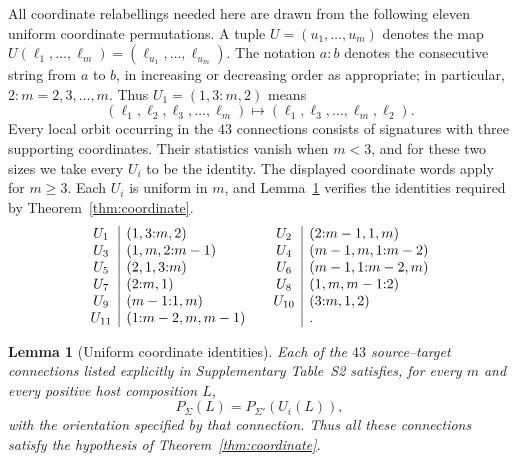 \documentclass[12pt]{article}
\newtheorem{lem}[thm]{Lemma}
\begin{document}
All coordinate relabellings needed here are drawn from the following eleven
uniform coordinate permutations.  A tuple
$U=(u_1,\ldots,u_m)$ denotes the map
$U(\ell_1,\ldots,\ell_m)=(\ell_{u_1},\ldots,\ell_{u_m})$.
The notation $a{:}b$ denotes the consecutive string from $a$ to $b$, in
increasing or decreasing order as appropriate; in particular,
$2{:}m=2,3,\ldots,m$.  Thus
$U_1=(1,3{:}m,2)$ means
\[
(\ell_1,\ell_2,\ell_3,\ldots,\ell_m)
\longmapsto
(\ell_1,\ell_3,\ldots,\ell_m,\ell_2).
\]
Every local orbit occurring in the $43$ connections consists of signatures
with three supporting coordinates.  Their statistics vanish
when $m<3$, and for these two sizes we take every $U_i$ to be the identity.
The displayed coordinate words apply for $m\ge3$.  Each $U_i$ is uniform in
$m$, and Lemma~\ref{lem:coordinate-identities} verifies the identities required by
Theorem~\ref{thm:coordinate}.
\[
\begin{array}{c|l@{\qquad}c|l}
U_1&(1,3{:}m,2)&U_2&(2{:}m-1,1,m)\\
U_3&(1,m,2{:}m-1)&U_4&(m-1,m,1{:}m-2)\\
U_5&(2,1,3{:}m)&U_6&(m-1,1{:}m-2,m)\\
U_7&(2{:}m,1)&U_8&(1,m,m-1{:}2)\\
U_9&(m-1{:}1,m)&U_{10}&(3{:}m,1,2)\\
U_{11}&(1{:}m-2,m,m-1)&&.
\end{array}
\]

\begin{lem}[Uniform coordinate identities]
\label{lem:coordinate-identities}
Each of the $43$ source--target connections listed explicitly in
Supplementary Table~S2 satisfies, for every $m$ and every positive host
composition $L$,
\[
P_{\Sigma}(L)=P_{\Sigma'}(U_i(L)),
\]
with the orientation specified by that connection.  Thus all these
connections satisfy the hypothesis of Theorem~\ref{thm:coordinate}.
\end{lem}
\end{document}
